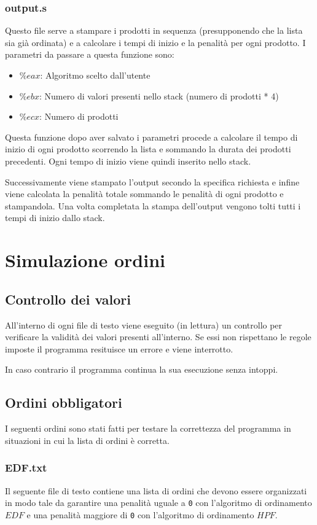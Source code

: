 \documentclass[a4paper]{article}
\begin{document}
\subsubsection{output.s}
\label{output}
Questo file serve a stampare i prodotti in sequenza (presupponendo che la lista sia già
ordinata) e a calcolare i tempi di inizio e la penalità per ogni prodotto. I parametri
da passare a questa funzione sono:
\begin{itemize}
	\item \( \%eax \): Algoritmo scelto dall'utente
	\item \( \%ebx \): Numero di valori presenti nello stack (numero di prodotti * 4)
	\item \( \%ecx \): Numero di prodotti
\end{itemize}
Questa funzione dopo aver salvato i parametri procede a calcolare il tempo di inizio
di ogni prodotto scorrendo la lista e sommando la durata dei prodotti precedenti. Ogni
tempo di inizio viene quindi inserito nello stack.

\noindent Successivamente viene stampato l'output secondo la specifica richiesta e infine
viene calcolata la penalità totale sommando le penalità di ogni prodotto e stampandola.
Una volta completata la stampa dell'output vengono tolti tutti i tempi di inizio dallo
stack.


\section{Simulazione ordini}
\subsection{Controllo dei valori}
All'interno di ogni file di testo viene eseguito (in lettura) un controllo per verificare
la validità dei valori presenti all'interno. Se essi non rispettano le regole imposte il
programma resituisce un errore e viene interrotto.

\noindent In caso contrario il programma continua la sua esecuzione senza intoppi.

\subsection{Ordini obbligatori}
I seguenti ordini sono stati fatti per testare la correttezza del programma in situazioni
in cui la lista di ordini è corretta.

\subsubsection{EDF.txt}
Il seguente file di testo contiene una lista di ordini che devono essere organizzati in
modo tale da garantire una penalità uguale a \texttt{0} con l'algoritmo di ordinamento
\textbf{$EDF$} e una penalità maggiore di \texttt{0} con l'algoritmo di
ordinamento  \textbf{$HPF$}.
\end{document}
